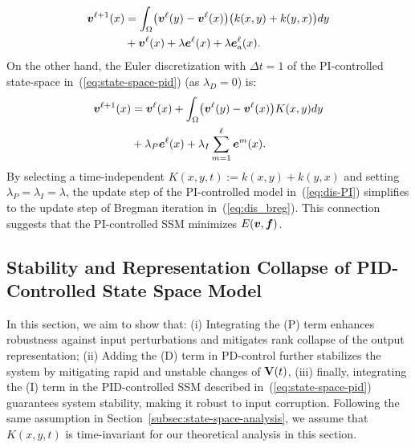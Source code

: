 \begin{align}
   \label{eq:dis_breg}
   {\bm v}^{\ell + 1}(x) 
   &= \int_{\Omega} \bigl(\bm{v}^{\ell}(y) - \bm{v}^{\ell}(x) \bigl)\bigl(k(x, y) + k(y,x)\bigl)dy \nonumber \\
   & + {\bm v}^{\ell}(x) + \lambda \bm{e}^{\ell}(x) + \lambda\bm{e}^{\ell}_{\mathrm{a}}(x).
\end{align}
On the other hand, the Euler discretization with $\Delta t = 1$ of the PI-controlled state-space in~(\ref{eq:state-space-pid}) (as $\lambda_D = 0$) is:
\begin{equation}
\begin{aligned}
\label{eq:dis-PI}
    {\bm v}^{\ell + 1}(x) &= {\bm v}^{\ell}(x) + \int_{\Omega} \bigl(\bm{v}^{\ell}(y) - \bm{v}^{\ell}(x) \bigl)K(x, y)dy \\
    &+ \lambda_P \bm{e}^{\ell}(x) + \lambda_I \sum_{m = 1}^{\ell} \bm{e}^m(x).
\end{aligned}
\end{equation}
By selecting a time-independent $K(x, y, t) := k(x, y) + k(y, x)$ and setting $\lambda_P = \lambda_I = \lambda$, the update step of the PI-controlled model in~(\ref{eq:dis-PI}) simplifies to the update step of Bregman iteration in~(\ref{eq:dis_breg}). This connection suggests that the PI-controlled SSM minimizes $E({\bm v}, {\bm f})$.
\subsection{Stability and Representation Collapse of PID-Controlled State Space Model}

In this section, we aim to show that: (i) Integrating the (P) term enhances robustness against input perturbations and mitigates rank collapse of the output representation; (ii) Adding the (D) term in PD-control further stabilizes the system by mitigating rapid and unstable changes of ${\mathbf V}(t)$, (iii) finally, integrating the (I) term in the PID-controlled SSM described in~(\ref{eq:state-space-pid}) guarantees system stability, making it robust to input corruption. Following the same assumption in Section~\ref{subsec:state-space-analysis}, we assume that $K(x, y, t)$ is time-invariant for our theoretical analysis in this section.
